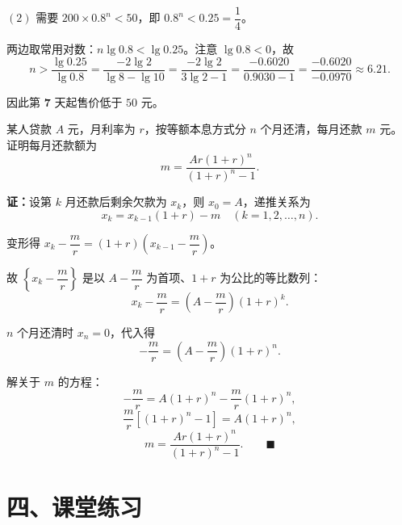 \documentclass[12pt, a4paper]{ctexart}
\begin{document}
$(2)$ 需要 $200 \times 0.8^n < 50$，即 $0.8^n < 0.25 = \dfrac{1}{4}$。

两边取常用对数：$n \lg 0.8 < \lg 0.25$。注意 $\lg 0.8 < 0$，故
\[
  n > \frac{\lg 0.25}{\lg 0.8} = \frac{-2\lg 2}{\lg 8 - \lg 10} = \frac{-2\lg 2}{3\lg 2 - 1} = \frac{-0.6020}{0.9030 - 1} = \frac{-0.6020}{-0.0970} \approx 6.21.
\]

因此第 $\mathbf{7}$ 天起售价低于 $50$ 元。

\begin{appbox}[【应用4】分期还款问题]
某人贷款 $A$ 元，月利率为 $r$，按等额本息方式分 $n$ 个月还清，每月还款 $m$ 元。证明每月还款额为
\[
  m = \frac{A r(1+r)^n}{(1+r)^n - 1}.
\]
\end{appbox}

\noindent\textbf{证：}设第 $k$ 月还款后剩余欠款为 $x_k$，则 $x_0 = A$，递推关系为
\[
  x_k = x_{k-1}(1 + r) - m \quad (k = 1, 2, \ldots, n).
\]

变形得 $x_k - \dfrac{m}{r} = (1+r)\!\left(x_{k-1} - \dfrac{m}{r}\right)$。

故 $\left\{x_k - \dfrac{m}{r}\right\}$ 是以 $A - \dfrac{m}{r}$ 为首项、$1+r$ 为公比的等比数列：
\[
  x_k - \frac{m}{r} = \left(A - \frac{m}{r}\right)(1+r)^k.
\]

$n$ 个月还清时 $x_n = 0$，代入得
\[
  -\frac{m}{r} = \left(A - \frac{m}{r}\right)(1+r)^n.
\]

解关于 $m$ 的方程：
\[
  -\frac{m}{r} = A(1+r)^n - \frac{m}{r}(1+r)^n,
\]
\[
  \frac{m}{r}\left[(1+r)^n - 1\right] = A(1+r)^n,
\]
\[
  m = \frac{Ar(1+r)^n}{(1+r)^n - 1}. \qquad \blacksquare
\]

\section*{\textcolor{tipgreen}{四、课堂练习}}
\end{document}
